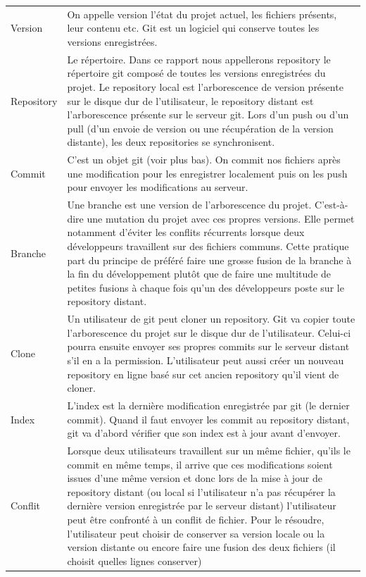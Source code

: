 \noindent
\begin{tabular}{p{}p{}}
	Version & 
	On appelle version l’état du projet actuel, les fichiers présents, leur contenu etc. Git est un logiciel qui conserve toutes les versions enregistrées. \\
	
	Repository &
	Le répertoire. Dans ce rapport nous appellerons repository le répertoire git composé de toutes les versions enregistrées du projet. Le repository local est l’arborescence de version présente sur le disque dur de l’utilisateur, le repository distant est l’arborescence présente sur le serveur git. Lors d’un push ou d’un pull (d’un envoie de version ou une récupération de la version distante), les deux repositories se synchronisent. \\

	Commit &
	C’est un objet git (voir plus bas). On commit nos fichiers après une modification pour les enregistrer localement puis on les push pour envoyer les modifications au serveur.\\

	Branche &
	Une branche est une version de l’arborescence du projet. C’est-à-dire une mutation du projet avec ces propres versions. Elle permet notamment d’éviter les conflits récurrents lorsque deux développeurs travaillent sur des fichiers communs. Cette pratique part du principe de préféré faire une grosse fusion de la branche à la fin du développement plutôt que de faire une multitude de petites fusions à chaque fois qu’un des développeurs poste sur le repository distant. \\
	
	Clone &
	Un utilisateur de git peut cloner un repository. Git va copier toute l’arborescence du projet sur le disque dur de l’utilisateur. Celui-ci pourra ensuite envoyer ses propres commits sur le serveur distant s’il en a la permission. L’utilisateur peut aussi créer un nouveau repository en ligne basé sur cet ancien repository qu’il vient de cloner. \\

	Index &
	L’index est la dernière modification enregistrée par git (le dernier commit). Quand il faut envoyer les commit au repository distant, git va d’abord vérifier que son index est à jour avant d’envoyer. \\
	
	Conflit &
	Lorsque deux utilisateurs travaillent sur un même fichier, qu’ils le commit en même temps, il arrive que ces modifications soient issues d’une même version et donc lors de la mise à jour de repository distant (ou local si l’utilisateur n’a pas récupérer la dernière version enregistrée par le serveur distant) l’utilisateur peut être confronté à un conflit de fichier. Pour le résoudre, l’utilisateur peut choisir de conserver sa version locale ou la version distante ou encore faire une fusion des deux fichiers (il choisit quelles lignes conserver)
\end{tabular}

